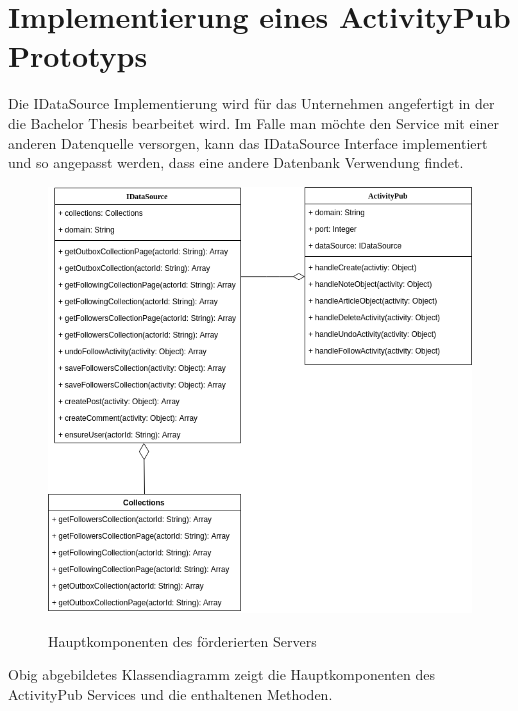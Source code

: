 
\chapter{Implementierung eines ActivityPub Prototyps}
Die IDataSource Implementierung wird für das Unternehmen angefertigt in der die Bachelor Thesis bearbeitet wird. Im Falle man möchte den Service mit einer anderen Datenquelle versorgen, kann das IDataSource Interface implementiert und so angepasst werden, dass eine andere Datenbank Verwendung findet.\\
\begin{figure}[h]
	\begin{minipage}{\textwidth}
		\centering
		\includegraphics[scale=0.6]{figures/klassendiagramm-activitypub.png}
		\label{klassendiagramm-activitypub}
		\caption{Hauptkomponenten des förderierten Servers}
	\end{minipage}
\end{figure}
Obig abgebildetes Klassendiagramm zeigt die Hauptkomponenten des ActivityPub Services und die enthaltenen Methoden.\\

